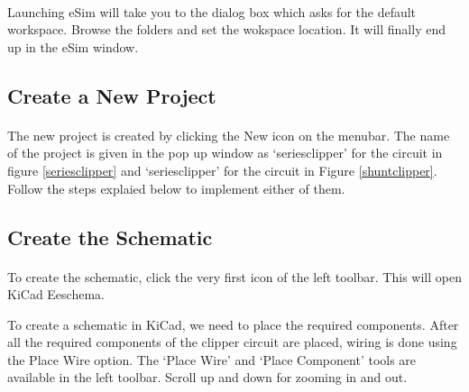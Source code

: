\paragraph{}
 Launching eSim will take you to the dialog box which asks for the default workspace. Browse the folders and set the wokspace location. It will finally end up in the eSim window.%

\subsection{Create a New Project}

\paragraph{ } The new project is created by clicking the New icon on the
menubar. The name of the project is given in the pop up window as `seriesclipper' for the circuit in figure \ref{seriesclipper} and `seriesclipper' for the circuit in Figure \ref{shuntclipper}. Follow the steps explaied below to implement either of them.
\subsection{Create the Schematic}

\paragraph{}  To create the schematic, click the very first icon of the
left toolbar. This will open KiCad Eeschema.


To create a schematic in KiCad, we need to place the required components. After all the required components of the clipper circuit are placed, wiring is
done using the Place Wire option. The `Place Wire' and `Place Component' tools are available in the left toolbar. Scroll up and down for zooming in and out.




